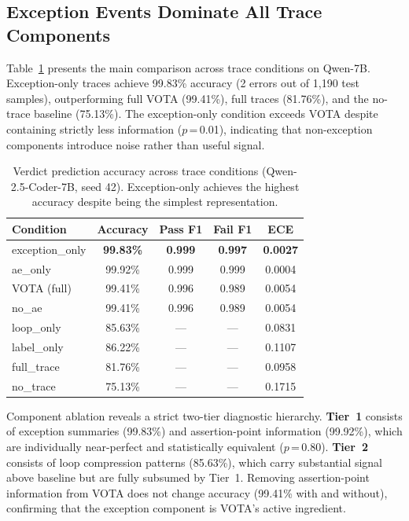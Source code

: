 \documentclass[11pt]{article}
\begin{document}
\subsection{Exception Events Dominate All Trace Components}
\label{sec:exp-main}

Table~\ref{tab:main-results} presents the main comparison across trace conditions on Qwen-7B. Exception-only traces achieve 99.83\% accuracy (2 errors out of 1{,}190 test samples), outperforming full VOTA (99.41\%), full traces (81.76\%), and the no-trace baseline (75.13\%). The exception-only condition exceeds VOTA despite containing strictly less information ($p$\,=\,0.01), indicating that non-exception components introduce noise rather than useful signal.

\begin{table}[t]
\centering
\caption{Verdict prediction accuracy across trace conditions (Qwen-2.5-Coder-7B, seed 42). Exception-only achieves the highest accuracy despite being the simplest representation.}
\label{tab:main-results}
\small
\begin{tabular}{lcccc}
\toprule
\textbf{Condition} & \textbf{Accuracy} & \textbf{Pass F1} & \textbf{Fail F1} & \textbf{ECE} \\
\midrule
exception\_only & \textbf{99.83\%} & \textbf{0.999} & \textbf{0.997} & \textbf{0.0027} \\
ae\_only & 99.92\% & 0.999 & 0.999 & 0.0004 \\
VOTA (full) & 99.41\% & 0.996 & 0.989 & 0.0054 \\
no\_ae & 99.41\% & 0.996 & 0.989 & 0.0054 \\
loop\_only & 85.63\% & --- & --- & 0.0831 \\
label\_only & 86.22\% & --- & --- & 0.1107 \\
full\_trace & 81.76\% & --- & --- & 0.0958 \\
no\_trace & 75.13\% & --- & --- & 0.1715 \\
\bottomrule
\end{tabular}
\end{table}

Component ablation reveals a strict two-tier diagnostic hierarchy. \textbf{Tier~1} consists of exception summaries (99.83\%) and assertion-point information (99.92\%), which are individually near-perfect and statistically equivalent ($p$\,=\,0.80). \textbf{Tier~2} consists of loop compression patterns (85.63\%), which carry substantial signal above baseline but are fully subsumed by Tier~1. Removing assertion-point information from VOTA does not change accuracy (99.41\% with and without), confirming that the exception component is VOTA's active ingredient.
\end{document}
